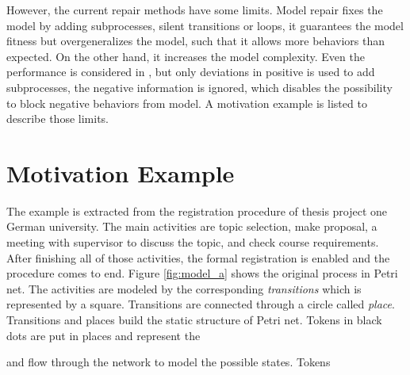 However, the current repair methods have some limits. Model repair fixes the model by adding subprocesses, silent transitions or loops, it guarantees the model fitness but overgeneralizes the model, such that it allows more behaviors than expected. On the other hand, it increases the model complexity.  Even the performance is considered in \cite{dees2017enhancing}, but only deviations in positive is used to add subprocesses, the negative information is ignored, which disables the possibility to block negative behaviors from model.  A motivation example is listed to describe those limits.
\section{Motivation Example}
The example is extracted from the registration procedure of thesis project one German university. The main activities are topic selection, make proposal, a meeting with supervisor to discuss the topic, and check course requirements. After finishing all of those activities, the formal registration is enabled and the procedure comes to end.
Figure \ref{fig:model_a} shows the original process in Petri net. The activities are modeled by the corresponding \emph{transitions} which is represented by a square. Transitions are connected through a circle called \emph{place}. Transitions and places build the static structure of Petri net. Tokens in black dots are put in places and represent the 

and flow through the network to model the possible states. Tokens 

